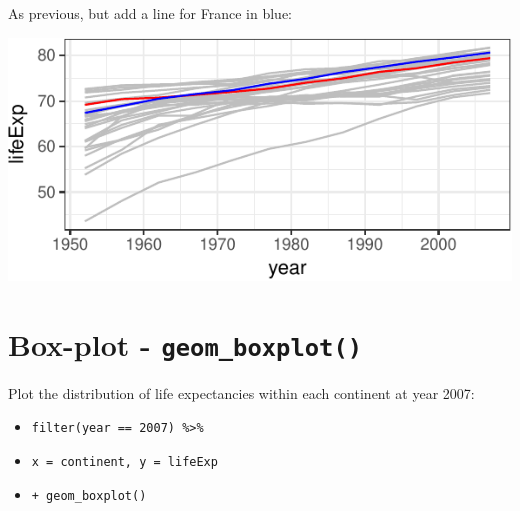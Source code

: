 \documentclass[12pt,]{krantz}
\makeatletter
\newenvironment{Shaded}{\begin{snugshade}}{\end{snugshade}}
\newcommand{\DataTypeTok}[1]{\textcolor[rgb]{0.13,0.29,0.53}{#1}}
\newcommand{\DecValTok}[1]{\textcolor[rgb]{0.00,0.00,0.81}{#1}}
\newcommand{\KeywordTok}[1]{\textcolor[rgb]{0.13,0.29,0.53}{\textbf{#1}}}
\newcommand{\NormalTok}[1]{#1}
\newcommand{\OperatorTok}[1]{\textcolor[rgb]{0.81,0.36,0.00}{\textbf{#1}}}
\newcommand{\StringTok}[1]{\textcolor[rgb]{0.31,0.60,0.02}{#1}}
\providecommand{\tightlist}{%
  \setlength{\itemsep}{0pt}\setlength{\parskip}{0pt}}
\newenvironment{kframe}{%
\medskip{}
\setlength{\fboxsep}{.8em}
 \def\at@end@of@kframe{}%
 \ifinner\ifhmode%
  \def\at@end@of@kframe{\end{minipage}}%
  \begin{minipage}{\columnwidth}%
 \fi\fi%
 \def\FrameCommand##1{\hskip\@totalleftmargin \hskip-\fboxsep
 \colorbox{shadecolor}{##1}\hskip-\fboxsep
     \hskip-\linewidth \hskip-\@totalleftmargin \hskip\columnwidth}%
 \MakeFramed {\advance\hsize-\width
   \@totalleftmargin\z@ \linewidth\hsize
   \@setminipage}}%
 {\par\unskip\endMakeFramed%
 \at@end@of@kframe}
\renewenvironment{Shaded}{\begin{kframe}}{\end{kframe}}
\theoremstyle{definition}
\theoremstyle{definition}
\theoremstyle{definition}
\theoremstyle{remark}
\makeatother
\begin{document}
As previous, but add a line for France in blue:

\includegraphics{04_plotting_files/figure-latex/unnamed-chunk-8-1.pdf}

\hypertarget{box-plot---geom_boxplot}{%
\section{\texorpdfstring{Box-plot -
\texttt{geom\_boxplot()}}{Box-plot - geom\_boxplot()}}\label{box-plot---geom_boxplot}}

Plot the distribution of life expectancies within each continent at year
2007:

\begin{itemize}
\tightlist
\item
  \texttt{filter(year\ ==\ 2007)\ \%\textgreater{}\%}
\item
  \texttt{x\ =\ continent,\ y\ =\ lifeExp}
\item
  \texttt{+\ geom\_boxplot()}
\end{itemize}

\begin{Shaded}
\end{Shaded}
\end{document}
